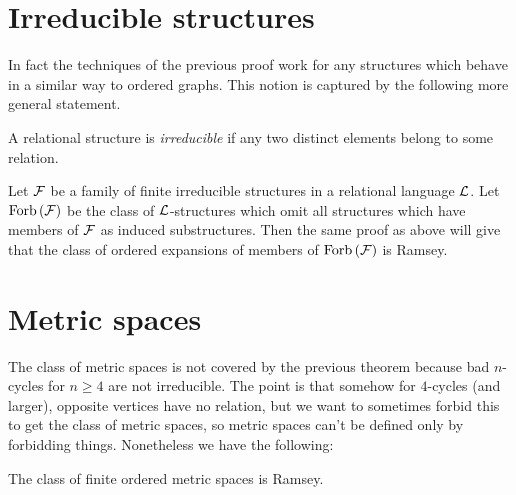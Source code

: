 \documentclass{amsart}
\begin{document}
\section{Irreducible structures}

In fact the techniques of the previous proof work for any structures which behave in a
similar way to ordered graphs. This notion is captured by the following more general
statement.

\begin{defn}
A relational structure is \emph{irreducible} if any two distinct elements belong to some
relation.
\end{defn}

Let $\mathcal{F}$ be a family of finite irreducible structures in a relational language $\mathcal{L}$. Let
$\operatorname{Forb}\left( \mathcal{F} \right)$ be the class of $\mathcal{L}$-structures which omit all structures which
have members of $\mathcal{F}$ as induced substructures.
Then the same proof as above will give that the class of ordered
expansions of members of $\operatorname{Forb}\left( \mathcal{F} \right)$ is Ramsey.

\section{Metric spaces}

The class of metric spaces is not covered by the previous theorem because bad $n$-cycles
for $n\geq 4$ are not irreducible.
The point is that somehow for $4$-cycles (and larger), opposite vertices have no relation, but we want
to sometimes forbid this to get the class of metric spaces, 
so metric spaces can't be defined only by forbidding things. 
Nonetheless we have the following:

\begin{thm}
The class of finite ordered metric spaces is Ramsey.
\end{thm}
\end{document}
